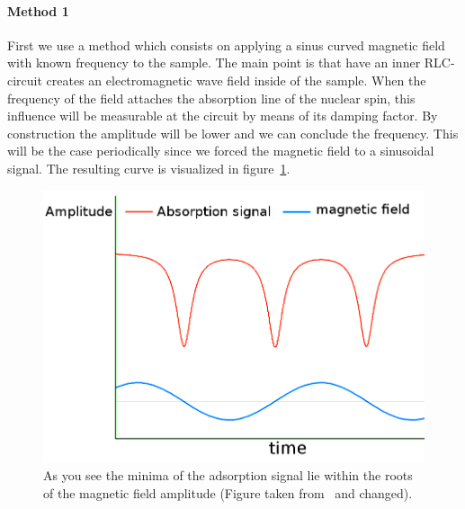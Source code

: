 \paragraph{Method 1} First we use a method which consists on applying a 
sinus curved magnetic field with known frequency to the sample. 
The main point is that have an inner RLC-circuit creates an electromagnetic
wave field inside of the sample. When the frequency of the field attaches
the absorption line of the nuclear spin, this influence will be measurable
at the circuit by means of its damping factor. By construction the 
amplitude will be lower and we can conclude the frequency. This will
be the case periodically since we forced the magnetic field to a 
sinusoidal signal. The resulting curve is visualized 
in figure~\ref{fig:method1}. 
\begin{figure}[htpb]
    \centering
    \includegraphics[width=0.7\linewidth]{figures/method1}
    \caption{As you see the minima of the adsorption signal lie within
        the roots of the magnetic field amplitude (Figure
            taken from~\cite{ver} and changed).}
    \label{fig:method1}
\end{figure} \\\\

